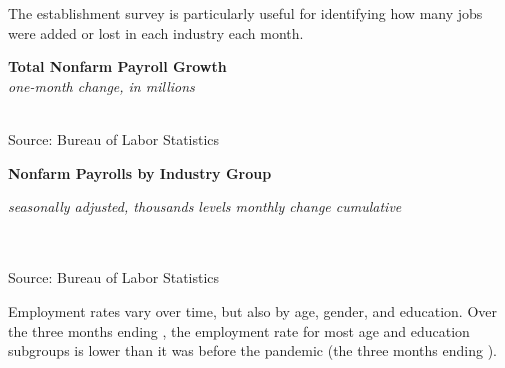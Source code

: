\documentclass{report}
\makeatletter
\newcommand{\tbllink}[1]{\href{https://raw.githubusercontent.com/bdecon/US-chartbook/master/chartbook/data/#1}{\faTable}}
\newcommand*\short[1]{\expandafter\@gobbletwo\number\numexpr#1\relax}
\newcommand{\ctsbar}[5]{
		\addplot[ybar stacked, bar width=#5, draw opacity=0, fill=#1] 
			table [x=#2, y=#3, col sep=comma]{#4};}
\newcommand{\absnode}[3]{\node[below right, align=left] at (axis cs: #1,#2) {#3};}
\newcommand{\ltdateaxisticks}{
		date coordinates in=x, axis line style={draw=none},
		xmax={2022-03-15},
		max space between ticks=40,	    
		xtick={{2013-01-01}, {2014-01-01}, {2015-01-01}, {2016-01-01}, {2017-01-01}, {2018-01-01}, 
		    {2019-01-01}, {2020-01-01}, {2021-01-01}, {2022-01-01}},
		enlarge y limits={0.06}, enlarge x limits={0.01},
		}
\newcommand{\bbar}[2]{extra #1 ticks = {{#2}}, extra #1 tick labels = ,
		extra #1 tick style = {grid=major, grid style={thick, black!25}},}
\newcommand{\rbar}{
		\fill[color=black!10] (axis cs:{2020-02-01},\pgfkeysvalueof{/pgfplots/ymin}) rectangle 
			(axis cs:{2020-05-01}, \pgfkeysvalueof{/pgfplots/ymax});}
\makeatother
\begin{document}
{\begin{minipage}{0.36\textwidth}
The establishment survey is particularly useful for identifying how many jobs were added or lost in each industry each month. 
\end{minipage} \hspace{6mm}
\begin{minipage}{0.35\textwidth}
\normalsize \textbf{Total Nonfarm Payroll Growth}\\
\footnotesize{\textit{one-month change, in millions}}\\
\hspace*{-3mm} \\
\footnotesize{Source: Bureau of Labor Statistics} \hfill \tbllink{nfp.csv}
\end{minipage}
\vspace{3mm}

\normalsize \textbf{Nonfarm Payrolls by Industry Group}\\
\footnotesize{\textit{seasonally adjusted, thousands \hspace{8mm}levels \hspace{16mm} monthly change \hspace{25mm} cumulative}\\
\vspace{-5mm}

\hspace*{-3mm} \noindent {} \setlength{\tabcolsep}{3.0pt} \color{black!90}
		{\renewcommand{\arraystretch}{1.57}
		 \begin{tabular}{p{37mm} R{12.6mm} R{12.6mm} | R{9.0mm} R{9.0mm} R{9.0mm} 
		   R{9.0mm} | R{12.0mm} R{12.0mm}}
			  \hline
		\end{tabular}
		}	\\
		
\vspace{-2mm}
\footnotesize{Source: Bureau of Labor Statistics} \hspace{9.5cm} \tbllink{ces_data.csv}
\newpage
\begin{minipage}{0.76\textwidth} 
\small Employment rates vary over time, but also by age, gender, and education. Over the three months ending \unskip, the employment rate for most age and education subgroups is lower than it was before the pandemic (the three months ending \unskip).
\vspace{2mm}


\end{minipage}}}
\end{document}
